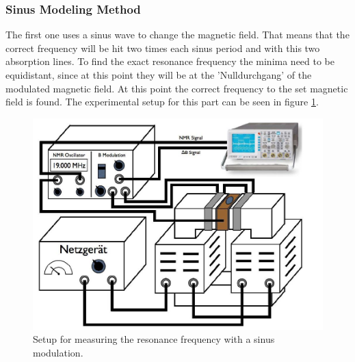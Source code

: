 \subsubsection{Sinus Modeling Method}
The first one uses a sinus wave to change the magnetic field. That means that the correct frequency will be hit two times each sinus period and with this two absorption lines. To find the exact resonance frequency the minima need to be equidistant, since at this point they will be at the 'Nulldurchgang' of the modulated magnetic field. At this point the correct frequency to the set magnetic field is found. The experimental setup for this part can be seen in figure \ref{Exp_part1}.
\begin{figure}[ht]
	\includegraphics[scale=0.8]{Bild/Setup1}
	\centering
	\caption[Block Diagram for Setup 1]{Setup for measuring the resonance frequency with a sinus modulation.}
	\label{Exp_part1}
\end{figure}
